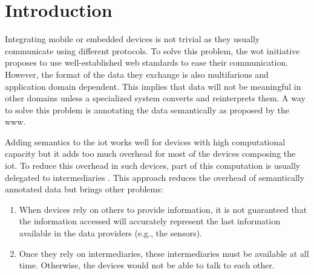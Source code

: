 \section{Introduction}
\label{sec:search_intro}

% 

Integrating mobile or embedded devices is not trivial as they usually communicate using different protocols.
To solve this problem, the \acl{wot} initiative proposes to use well-established web standards to ease their communication.
However, the format of the data they exchange is also multifarious and application domain dependent.
This implies that data will not be meaningful in other domains unless a specialized system converts and reinterprets them.
A way to solve this problem is annotating the data semantically as proposed by the \ac{www}.

Adding semantics to the \ac{iot} works well for devices with high computational capacity but it adds too much overhead for most of the devices composing the \ac{iot}.
To reduce this overhead in such devices, part of this computation is usually delegated to intermediaries \citep{honkola_smart-m3_2010}.
This approach reduces the overhead of semantically annotated data but brings other problems:
\begin{enumerate}
  \item When devices rely on others to provide information, it is not guaranteed that the information accessed will accurately represent the last information available in the data providers (e.g., the sensors).
  \item Once they rely on intermediaries, these intermediaries must be available at all time.
	Otherwise, the devices would not be able to talk to each other.
\end{enumerate}

